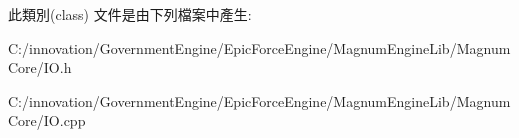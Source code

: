 此類別(class) 文件是由下列檔案中產生\+:\begin{DoxyCompactItemize}
\item 
C\+:/innovation/\+Government\+Engine/\+Epic\+Force\+Engine/\+Magnum\+Engine\+Lib/\+Magnum\+Core/I\+O.\+h\item 
C\+:/innovation/\+Government\+Engine/\+Epic\+Force\+Engine/\+Magnum\+Engine\+Lib/\+Magnum\+Core/I\+O.\+cpp\end{DoxyCompactItemize}
